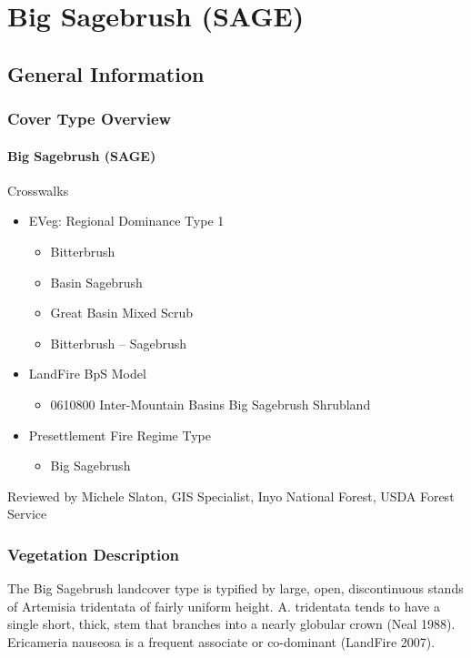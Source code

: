 
\section{Big Sagebrush (SAGE)}
\label{sage-description}
\subsection{General Information}

\subsubsection{Cover Type Overview}

\paragraph{Big Sagebrush (SAGE)}

Crosswalks
\begin{itemize}
	\item EVeg: Regional Dominance Type 1
	\begin{itemize}
		\item Bitterbrush 
		\item Basin Sagebrush
		\item Great Basin Mixed Scrub
		\item Bitterbrush – Sagebrush
	\end{itemize}

	\item LandFire BpS Model
	\begin{itemize}
		\item 0610800 Inter-Mountain Basins Big Sagebrush Shrubland
	\end{itemize}

	\item Presettlement Fire Regime Type
	\begin{itemize}
		\item Big Sagebrush
	\end{itemize}
\end{itemize}

Reviewed by Michele Slaton, GIS Specialist, Inyo National Forest, USDA Forest Service

\subsubsection{Vegetation Description}
The Big Sagebrush landcover type is typified by large, open, discontinuous stands of Artemisia tridentata of fairly uniform height. A. tridentata tends to have a single short, thick, stem that branches into a nearly globular crown (Neal 1988). Ericameria nauseosa is a frequent associate or co-dominant (LandFire 2007).


